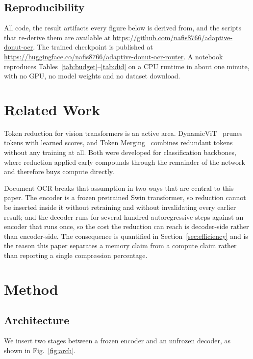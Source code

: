\documentclass[conference]{IEEEtran}
\begin{document}
\subsection{Reproducibility}

All code, the result artifacts every figure below is derived from, and the scripts that
re-derive them are available at \url{https://github.com/nafis8766/adaptive-donut-ocr}. The
trained checkpoint is published at
\url{https://huggingface.co/nafis8766/adaptive-donut-ocr-router}. A notebook reproduces
Tables~\ref{tab:budget}--\ref{tab:did} on a CPU runtime in about one minute, with no GPU, no
model weights and no dataset download.

\section{Related Work}

Token reduction for vision transformers is an active area. DynamicViT~\cite{dynamicvit}
prunes tokens with learned scores, and Token Merging~\cite{tome} combines redundant tokens
without any training at all. Both were developed for classification backbones, where
reduction applied early compounds through the remainder of the network and therefore buys
compute directly.

Document OCR breaks that assumption in two ways that are central to this paper. The encoder
is a frozen pretrained Swin transformer, so reduction cannot be inserted inside it without
retraining and without invalidating every earlier result; and the decoder runs for several
hundred autoregressive steps against an encoder that runs once, so the cost the reduction can
reach is decoder-side rather than encoder-side. The consequence is quantified in
Section~\ref{sec:efficiency} and is the reason this paper separates a memory claim from a
compute claim rather than reporting a single compression percentage.

\section{Method}

\subsection{Architecture}

We insert two stages between a frozen encoder and an unfrozen decoder, as shown in
Fig.~\ref{fig:arch}.
\end{document}
